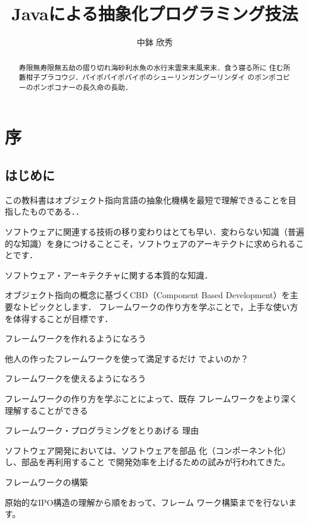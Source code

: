 \documentclass[a4j, twoside]{jsbook}
\title{Javaによる抽象化プログラミング技法}
\author{中鉢 欣秀}
\begin{document}
\maketitle

\setcounter{tocdepth}{4}
\tableofcontents
\listoffigures

\chapter*{序}

\begin{abstract}
寿限無寿限無五劫の摺り切れ海砂利水魚の水行末雲来末風来末．食う寝る所に
住む所藪柑子ブラコウジ．パイポパイポパイポのシューリンガングーリンダイ
のポンポコピーのポンポコナーの長久命の長助．
\end{abstract}

\section*{はじめに}

この教科書はオブジェクト指向言語の抽象化機構を最短で理解できることを目
指したものである．．

ソフトウェアに関連する技術の移り変わりはとても早い．変わらない知識（普遍的な知識）を身につけることこそ，ソフトウェアのアーキテクトに求められることです．

ソフトウェア・アーキテクチャに関する本質的な知識．

オブジェクト指向の概念に基づくCBD（Component Based Development）を主要なトピックとします．
フレームワークの作り方を学ぶことで，上手な使い方を体得することが目標です．

フレームワークを作れるようになろう 

他人の作ったフレームワークを使って満足するだけ
でよいのか？ 

フレームワークを使えるようになろう 

フレームワークの作り方を学ぶことによって、既存
フレームワークをより深く理解することができる 

フレームワーク・プログラミングをとりあげる
理由 

ソフトウェア開発においては、ソフトウェアを部品
化（コンポーネント化）し、部品を再利用すること
で開発効率を上げるための試みが行われてきた。 

フレームワークの構築 

原始的なIPO構造の理解から順をおって、フレーム
ワーク構築までを行ないます。 
\end{document}
